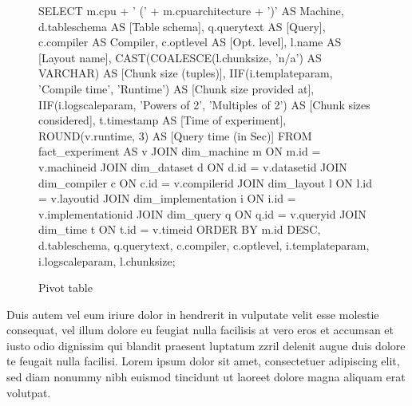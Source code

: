 \documentclass[10pt]{scrartcl}
\begin{document}
\newpage
\begin{wrapfigure}{r}{0.52\textwidth}
{ \centering %
{SELECT
m.cpu + ' (' +  m.cpuarchitecture + ')' AS Machine,
d.tableschema   AS [Table schema],
q.querytext     AS [Query],
c.compiler      AS Compiler,
c.optlevel      AS [Opt. level],
l.name          AS [Layout name],
CAST(COALESCE(l.chunksize, 'n/a') AS VARCHAR) AS [Chunk size (tuples)],
IIF(i.templateparam, 'Compile time', 'Runtime') AS [Chunk size provided at],
IIF(i.logscaleparam, 'Powers of 2', 'Multiples of 2') AS [Chunk sizes considered],
t.timestamp 	AS [Time of experiment],
ROUND(v.runtime, 3) 		AS [Query time (in Sec)]
FROM fact_experiment AS v
    JOIN dim_machine m ON m.id = v.machineid
    JOIN dim_dataset d ON d.id = v.datasetid
    JOIN dim_compiler c ON c.id = v.compilerid
    JOIN dim_layout l ON l.id = v.layoutid
    JOIN dim_implementation i ON i.id = v.implementationid
    JOIN dim_query q ON q.id = v.queryid
    JOIN dim_time t ON t.id = v.timeid
ORDER BY m.id DESC, d.tableschema, q.querytext,
    c.compiler, c.optlevel, i.templateparam, i.logscaleparam, l.chunksize;}
\\ }
\vspace{-5pt}
\caption{Pivot table}
\vspace{-23pt}
\end{wrapfigure}
Duis autem vel eum iriure dolor in hendrerit in vulputate velit esse molestie consequat, vel illum dolore eu feugiat nulla facilisis at vero eros et accumsan et iusto odio dignissim qui blandit praesent luptatum zzril delenit augue duis dolore te feugait nulla facilisi. Lorem ipsum dolor sit amet, consectetuer adipiscing elit, sed diam nonummy nibh euismod tincidunt ut laoreet dolore magna aliquam erat volutpat.\\[8pt]
\end{document}
